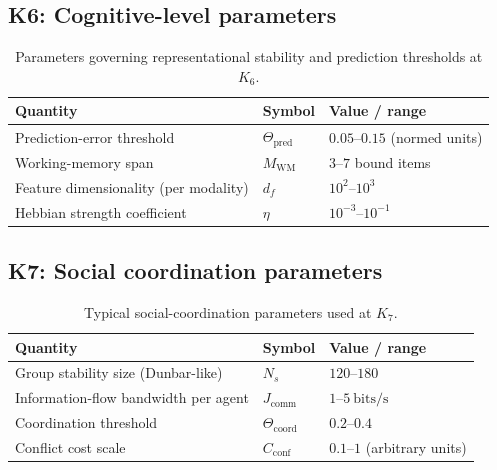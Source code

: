 
\subsection*{K6: Cognitive-level parameters}

\begin{table}[htbp]
  \centering
  \caption{Parameters governing representational stability and prediction thresholds at \(K_6\).}
  \label{tab:k6-cognitive-parameters}
  \begin{tabular}{@{}L{0.44\textwidth}L{0.16\textwidth}L{0.23\textwidth}@{}}
    \hline
    Quantity & Symbol & Value / range \\
    \hline
    Prediction-error threshold & \(\Theta_{\mathrm{pred}}\)
        & \(0.05\text{–}0.15\) (normed units) \\
    Working-memory span & \(M_\mathrm{WM}\)
        & \(3\text{–}7\) bound items \\
    Feature dimensionality (per modality) 
        & \(d_f\)
        & \(10^2\text{–}10^3\) \\
    Hebbian strength coefficient & \(\eta\)
        & \(10^{-3}\text{–}10^{-1}\) \\
    \hline
  \end{tabular}
\end{table}


\subsection*{K7: Social coordination parameters}

\begin{table}[htbp]
  \centering
  \caption{Typical social-coordination parameters used at \(K_7\).}
  \label{tab:k7-social-parameters}
  \begin{tabular}{@{}L{0.44\textwidth}L{0.16\textwidth}L{0.23\textwidth}@{}}
    \hline
    Quantity & Symbol & Value / range \\
    \hline
    Group stability size (Dunbar-like) & \(N_s\)
        & \(120\text{–}180\) \\
    Information-flow bandwidth per agent & \(J_\mathrm{comm}\)
        & \(1\text{–}5~\mathrm{bits/s}\) \\
    Coordination threshold & \(\Theta_{\mathrm{coord}}\)
        & \(0.2\text{–}0.4\) \\
    Conflict cost scale & \(C_\mathrm{conf}\)
        & \(0.1\text{–}1\) (arbitrary units) \\
    \hline
  \end{tabular}
\end{table}

